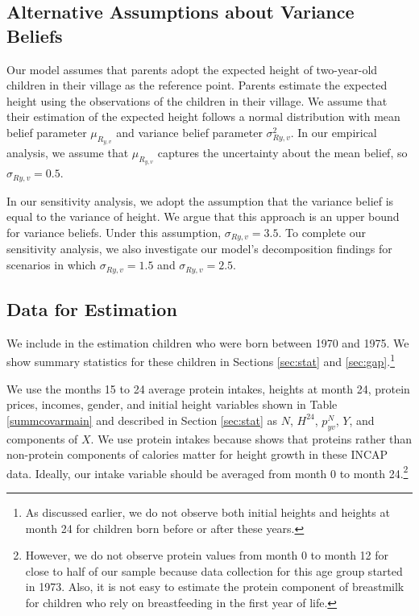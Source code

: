 \clearpage
\pagebreak

\subsection{Alternative Assumptions about Variance Beliefs} \label{sec:appsecalter}

Our model assumes that parents adopt the expected height of two-year-old children in their village as the reference point. Parents estimate the expected height using the observations of the children in their village. We assume that their estimation of the expected height follows a normal distribution with mean belief parameter $\mu_{R_{y,v}}$ and variance belief parameter $\sigma_{R{y,v}}^{2}$. In our empirical analysis, we assume that $\mu_{R_{y,v}}$  captures the uncertainty about the mean belief, so  $\sigma_{R{y,v}} = 0.5$.

In our sensitivity analysis, we adopt the assumption that the variance belief is equal to the variance of height. We argue that this approach is an upper bound for variance beliefs. Under this assumption, $\sigma_{R{y,v}} = 3.5$. To complete our sensitivity analysis, we also investigate our model's decomposition findings for scenarios in which $\sigma_{R{y,v}} = 1.5$ and $\sigma_{R{y,v}} = 2.5$.

\subsection{Data for Estimation \label{sec:estidata}}

We include in the estimation children who were born between 1970 and 1975. We show summary statistics for these children in Sections \ref{sec:stat} and \ref{sec:gap}.\footnote{As discussed earlier, we do not observe both initial heights and heights at month 24 for children born before or after these years.}

We use the months 15 to 24 average protein intakes, heights at month 24, protein prices, incomes, gender, and initial height variables shown in Table \ref{summcovarmain} and described in Section \ref{sec:stat} as $N$, $H^{24}$, $p_{yv}^{N}$, $Y$, and components of $X$. We use protein intakes because \textcite{puentes_early_2016} shows that proteins rather than non-protein components of calories matter for height growth in these INCAP data. Ideally, our intake variable should be averaged from month 0 to month 24.\footnote{However, we do not observe protein values from month 0 to month 12 for close to half of our sample because data collection for this age group started in 1973. Also, it is not easy to estimate the protein component of breastmilk for children who rely on breastfeeding in the first year of life.}

